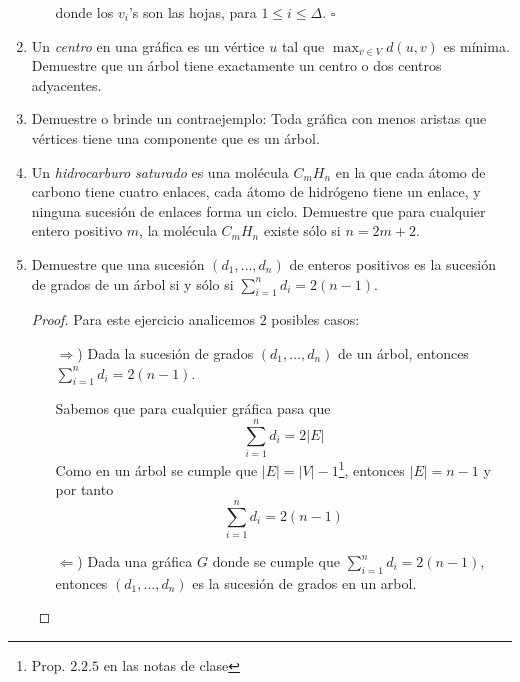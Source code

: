 \documentclass{article}
\begin{document}
\begin{enumerate}
\begin{enumerate}
      donde los $v_i$'s son las hojas, para $1 \leq i \leq \Delta$.
      \hfill $\square$
  \end{enumerate}
    
  \item Un {\em centro} en una gr\'afica es un v\'ertice
    $u$ tal que $\max_{v \in V} d(u, v)$ es m\'inima.
    Demuestre que un \'arbol tiene exactamente un centro
    o dos centros adyacentes.
    
  \item Demuestre o brinde un contraejemplo: Toda
    gr\'afica con menos aristas que v\'ertices tiene
    una componente que es un \'arbol.
    
  \item Un {\em hidrocarburo saturado} es una
    mol\'ecula $C_mH_n$ en la que cada \'atomo de
    carbono tiene cuatro enlaces, cada
    \'atomo de hidr\'ogeno tiene un enlace, y
    ninguna sucesi\'on de enlaces forma un ciclo.
    Demuestre que para cualquier entero positivo
    $m$, la mol\'ecula $C_mH_n$ existe s\'olo si
    $n = 2m + 2$.
    
  \item Demuestre que una sucesi\'on $(d_1, \dots,
    d_n)$ de enteros positivos es la sucesi\'on de
    grados de un \'arbol si y s\'olo si
    $\sum_{i=1}^n d_i = 2(n-1)$.
    
    \begin{proof}
      Para este ejercicio analicemos $2$ posibles casos:
      \begin{itemize}
      \item[$\Rightarrow$)] Dada la sucesi\'on de grados $(d_1, \dots, d_n)$ de un \'arbol,
        entonces $\sum_{i=1}^n d_i = 2(n-1)$.
        
        Sabemos que para cualquier gr\'afica pasa que
        \[
        \sum_{i=1}^n d_i = 2|E|
        \]
        Como en un \'arbol se cumple que $|E| = |V| - 1$\footnote{Prop. $2.2.5$ en las
          notas de clase}, entonces $|E| = n - 1$ y por tanto
        \[
        \sum_{i=1}^n d_i = 2(n - 1)
        \]
        
      \item[$\Leftarrow$)] Dada una gr\'afica $G$ donde se cumple que $\sum_{i=1}^n d_i = 2(n-1)$,
        entonces $(d_1, \dots, d_n)$ es la sucesi\'on de grados en un arbol.
        
      \end{itemize}
    \end{proof}
\end{enumerate}
\end{document}
